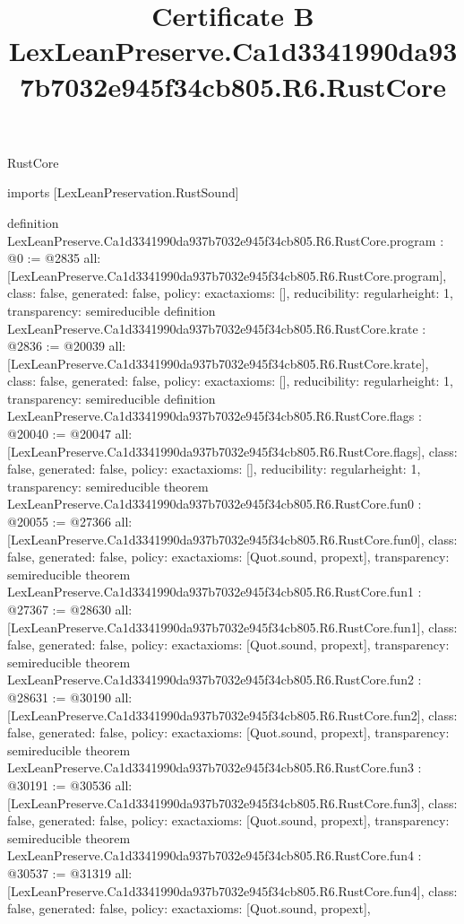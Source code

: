 \begin{lexlean}{RustCore}
\title{Certificate B LexLeanPreserve.Ca1d3341990da937b7032e945f34cb805.R6.RustCore}
\begin{coremodule}
imports [LexLeanPreservation.RustSound]

definition LexLeanPreserve.Ca1d3341990da937b7032e945f34cb805.R6.RustCore.program : @0 := @2835 {
  all: [LexLeanPreserve.Ca1d3341990da937b7032e945f34cb805.R6.RustCore.program],
  class: false,
  generated: false,
  policy: exact{axioms: []},
  reducibility: regular{height: 1},
  transparency: semireducible
}
definition LexLeanPreserve.Ca1d3341990da937b7032e945f34cb805.R6.RustCore.krate : @2836 := @20039 {
  all: [LexLeanPreserve.Ca1d3341990da937b7032e945f34cb805.R6.RustCore.krate],
  class: false,
  generated: false,
  policy: exact{axioms: []},
  reducibility: regular{height: 1},
  transparency: semireducible
}
definition LexLeanPreserve.Ca1d3341990da937b7032e945f34cb805.R6.RustCore.flags : @20040 := @20047 {
  all: [LexLeanPreserve.Ca1d3341990da937b7032e945f34cb805.R6.RustCore.flags],
  class: false,
  generated: false,
  policy: exact{axioms: []},
  reducibility: regular{height: 1},
  transparency: semireducible
}
theorem LexLeanPreserve.Ca1d3341990da937b7032e945f34cb805.R6.RustCore.fun0 : @20055 := @27366 {
  all: [LexLeanPreserve.Ca1d3341990da937b7032e945f34cb805.R6.RustCore.fun0],
  class: false,
  generated: false,
  policy: exact{axioms: [Quot.sound, propext]},
  transparency: semireducible
}
theorem LexLeanPreserve.Ca1d3341990da937b7032e945f34cb805.R6.RustCore.fun1 : @27367 := @28630 {
  all: [LexLeanPreserve.Ca1d3341990da937b7032e945f34cb805.R6.RustCore.fun1],
  class: false,
  generated: false,
  policy: exact{axioms: [Quot.sound, propext]},
  transparency: semireducible
}
theorem LexLeanPreserve.Ca1d3341990da937b7032e945f34cb805.R6.RustCore.fun2 : @28631 := @30190 {
  all: [LexLeanPreserve.Ca1d3341990da937b7032e945f34cb805.R6.RustCore.fun2],
  class: false,
  generated: false,
  policy: exact{axioms: [Quot.sound, propext]},
  transparency: semireducible
}
theorem LexLeanPreserve.Ca1d3341990da937b7032e945f34cb805.R6.RustCore.fun3 : @30191 := @30536 {
  all: [LexLeanPreserve.Ca1d3341990da937b7032e945f34cb805.R6.RustCore.fun3],
  class: false,
  generated: false,
  policy: exact{axioms: [Quot.sound, propext]},
  transparency: semireducible
}
theorem LexLeanPreserve.Ca1d3341990da937b7032e945f34cb805.R6.RustCore.fun4 : @30537 := @31319 {
  all: [LexLeanPreserve.Ca1d3341990da937b7032e945f34cb805.R6.RustCore.fun4],
  class: false,
  generated: false,
  policy: exact{axioms: [Quot.sound, propext]},
}
\end{coremodule}
\end{lexlean}
